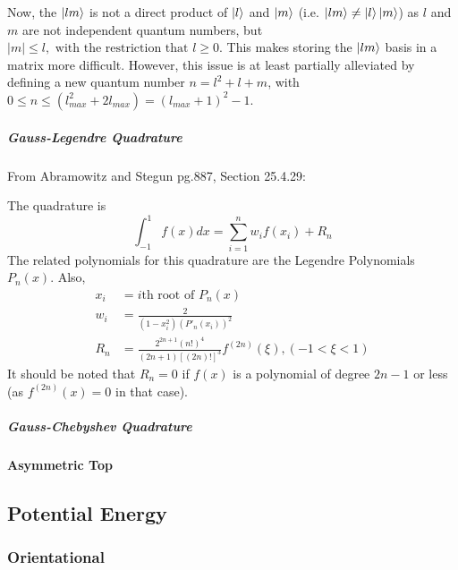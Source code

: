 \documentclass{revtex4-1}
\begin{document}
Now, the $\ket{lm}$ is not a direct product of $\ket{l}$ and $\ket{m}$ (i.e. $\ket{lm} \neq \ket{l}\ket{m}$) as $l$ and $m$ are not independent quantum numbers, but $|m|\leq l, \mbox{ with the restriction that } l\geq 0$. This makes storing the $\ket{lm}$ basis in a matrix more difficult. However, this issue is at least partially alleviated by defining a new quantum number $n = l^{2}+l+m$, with $0 \leq n \leq (l_{max}^{2}+2l_{max}) =(l_{max}+1)^{2}-1$.


\subparagraph{Gauss-Legendre Quadrature}\label{S:gaussLegendreQuad}

From Abramowitz and Stegun pg.887, Section 25.4.29:

The quadrature is
\begin{equation}
\int_{-1}^{1}f(x)dx = \sum_{i=1}^{n}w_{i}f(x_{i}) + R_{n}
\end{equation}
The related polynomials for this quadrature are the Legendre Polynomials $P_{n}(x)$. Also,
\begin{align}
x_{i} &= i\text{th root of } P_{n}(x)\\
w_{i} &= \frac{2}{(1-x_{i}^{2})(P'_{n}(x_{i}))^{2}}\\
R_{n} &= \frac{2^{2n+1}(n!)^{4}}{(2n+1)[(2n)!]^{3}}f^{(2n)}(\xi), (-1<\xi<1)
\end{align}
It should be noted that $R_{n} = 0$ if $f(x)$ is a polynomial of degree $2n-1$ or less (as $f^{(2n)}(x) = 0$ in that case).

\subparagraph{Gauss-Chebyshev Quadrature}\label{S:gaussChebyshevQuad}
												  
												  
\paragraph{Asymmetric Top}\label{S:AsRotBS} 

\subsection{Potential Energy}\label{S:PE}
\subsubsection{Orientational}\label{S:PEOri}
\end{document}

